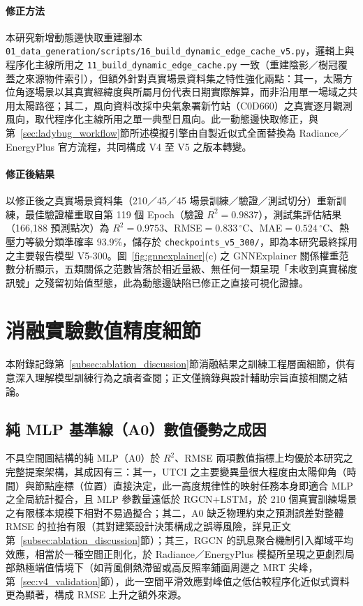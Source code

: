 \paragraph{修正方法} 本研究新增動態邊快取重建腳本 \texttt{01\_data\_generation/scripts/16\_build\_dynamic\_edge\_cache\_v5.py}，邏輯上與程序化主線所用之 \texttt{11\_build\_dynamic\_edge\_cache.py} 一致（重建陰影／樹冠覆蓋之來源物件索引），但額外針對真實場景資料集之特性強化兩點：其一，太陽方位角逐場景以其真實經緯度與所屬月份代表日期實際解算，而非沿用單一場域之共用太陽路徑；其二，風向資料改採中央氣象署新竹站（C0D660）之真實逐月觀測風向，取代程序化主線所用之單一典型日風向。此一動態邊快取修正，與第~\ref{sec:ladybug_workflow}節所述模擬引擎由自製近似式全面替換為 Radiance／EnergyPlus 官方流程，共同構成 V4 至 V5 之版本轉變。

\paragraph{修正後結果} 以修正後之真實場景資料集（210／45／45 場景訓練／驗證／測試切分）重新訓練，最佳驗證權重取自第 119 個 Epoch（驗證 $R^2=0.9837$），測試集評估結果（166,188 預測點次）為 $R^2=0.9753$、RMSE$=0.833\,^\circ\text{C}$、MAE$=0.524\,^\circ\text{C}$、熱壓力等級分類準確率 93.9\%，儲存於 \texttt{checkpoints\_v5\_300/}，即為本研究最終採用之主要報告模型 V5-300。圖~\ref{fig:gnnexplainer}(c) 之 GNNExplainer 關係權重范數分析顯示，五類關係之范數皆落於相近量級、無任何一類呈現「未收到真實梯度訊號」之殘留初始值型態，此為動態邊缺陷已修正之直接可視化證據。


\section{消融實驗數值精度細節}
\label{appx:ablation_numeric_detail}

本附錄記錄第~\ref{subsec:ablation_discussion}節消融結果之訓練工程層面細節，供有意深入理解模型訓練行為之讀者查閱；正文僅摘錄與設計輔助宗旨直接相關之結論。

\subsection{純 MLP 基準線（A0）數值優勢之成因}

不具空間圖結構的純 MLP（A0）於 $R^2$、RMSE 兩項數值指標上均優於本研究之完整提案架構，其成因有三：其一，UTCI 之主要變異量很大程度由太陽仰角（時間）與節點座標（位置）直接決定，此一高度規律性的映射任務本身即適合 MLP 之全局統計擬合，且 MLP 參數量遠低於 RGCN+LSTM，於 210 個真實訓練場景之有限樣本規模下相對不易過擬合；其二，A0 缺乏物理約束之預測誤差對整體 RMSE 的拉抬有限（其對建築設計決策構成之誤導風險，詳見正文第~\ref{subsec:ablation_discussion}節）；其三，RGCN 的訊息聚合機制引入鄰域平均效應，相當於一種空間正則化，於 Radiance／EnergyPlus 模擬所呈現之更劇烈局部熱極端值情境下（如背風側熱滯留或高反照率鋪面周邊之 MRT 尖峰，第~\ref{sec:v4_validation}節），此一空間平滑效應對峰值之低估較程序化近似式資料更為顯著，構成 RMSE 上升之額外來源。


